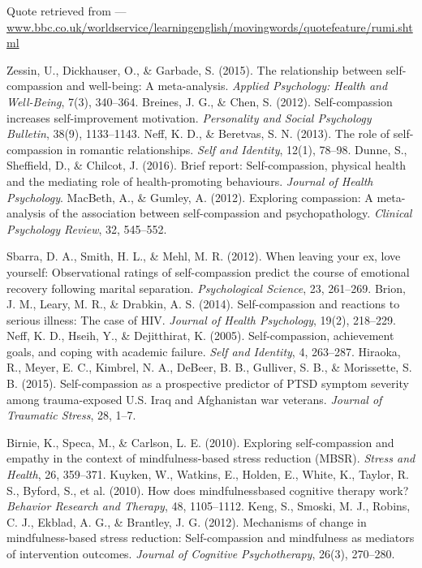 
\begin{thebibliography}{999}
	
	 Quote retrieved from --- \url{www.bbc.co.uk/worldservice/learningenglish/movingwords/quotefeature/rumi.shtml}
	
	 Zessin, U., Dickhauser, O., \& Garbade, S. (2015). The relationship between self-compassion and well-being: A meta-analysis. \textit{Applied Psychology: Health and Well-Being}, 7(3), 340–364.
	 Breines, J. G., \& Chen, S. (2012). Self-compassion increases self-improvement motivation. \textit{Personality and Social Psychology Bulletin}, 38(9), 1133–1143.
		Neff, K. D., \& Beretvas, S. N. (2013). The role of self-compassion in romantic relationships. \textit{Self and Identity}, 12(1), 78–98.
	 Dunne, S., Sheffield, D., \& Chilcot, J. (2016). Brief report: Self-compassion, physical health and the mediating role of health-promoting behaviours. \textit{Journal of Health Psychology}.
	 MacBeth, A., \& Gumley, A. (2012). Exploring compassion: A meta-analysis of the association between self-compassion and psychopathology. \textit{Clinical Psychology Review}, 32, 545–552.
	
	 Sbarra, D. A., Smith, H. L., \& Mehl, M. R. (2012). When leaving your ex, love yourself: Observational ratings of self-compassion predict the course of emotional recovery following marital separation. \textit{Psychological Science}, 23, 261–269.
	 Brion, J. M., Leary, M. R., \& Drabkin, A. S. (2014). Self-compassion and reactions to serious illness: The case of HIV. \textit{Journal of Health Psychology}, 19(2), 218–229.
	 Neff, K. D., Hseih, Y., \& Dejitthirat, K. (2005). Self-compassion, achievement goals, and coping with academic failure. \textit{Self and Identity}, 4, 263–287.
	 Hiraoka, R., Meyer, E. C., Kimbrel, N. A., DeBeer, B. B., Gulliver, S. B., \& Morissette, S. B. (2015). Self-compassion as a prospective predictor of PTSD symptom severity among trauma-exposed U.S. Iraq and Afghanistan war veterans. \textit{Journal of Traumatic Stress}, 28, 1–7.
	
	 Birnie, K., Speca, M., \& Carlson, L. E. (2010). Exploring self-compassion and empathy in the context of mindfulness-based stress reduction (MBSR). \textit{Stress and Health}, 26, 359–371.
	 Kuyken, W., Watkins, E., Holden, E., White, K., Taylor, R. S., Byford, S., et al. (2010). How does mindfulnessbased cognitive therapy work? \textit{Behavior Research and Therapy}, 48, 1105–1112.
	 Keng, S., Smoski, M. J., Robins, C. J., Ekblad, A. G., \& Brantley, J. G. (2012). Mechanisms of change in mindfulness-based stress reduction: Self-compassion and mindfulness as mediators of intervention outcomes. \textit{Journal of Cognitive Psychotherapy}, 26(3), 270–280.
	

\end{thebibliography}
